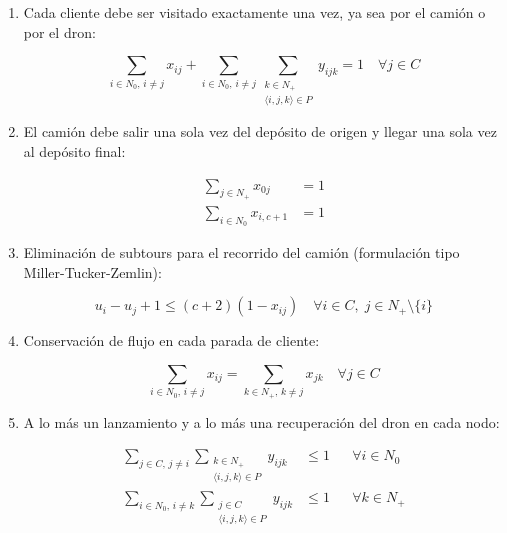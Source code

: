 \begin{enumerate}

\item Cada cliente debe ser visitado exactamente una vez, ya sea por el camión o por el dron:

\begin{equation}
\sum_{i \in N_0,\, i \neq j} x_{ij} + \sum_{i \in N_0,\, i \neq j} \sum_{\substack{k \in N_+ \\ \langle i,j,k \rangle \in P}} y_{ijk} = 1 \quad \forall j \in C 
\tag{2}
\end{equation}

\item El camión debe salir una sola vez del depósito de origen y llegar una sola vez al depósito final:

\begin{align*}
\sum_{j \in N_+} x_{0j} &= 1 \tag{3} \\
\sum_{i \in N_0} x_{i, c+1} &= 1 \tag{4}
\end{align*}

\item Eliminación de subtours para el recorrido del camión (formulación tipo Miller-Tucker-Zemlin):

\begin{equation}
u_i - u_j + 1 \le (c+2)(1 - x_{ij}) \quad \forall i \in C, \; j \in N_+ \setminus \{i\} 
\tag{5}
\end{equation}

\item Conservación de flujo en cada parada de cliente:

\begin{equation}
\sum_{i \in N_0,\, i \neq j} x_{ij} = \sum_{k \in N_+,\, k \neq j} x_{jk} \quad \forall j \in C 
\tag{6}
\end{equation}

\item A lo más un lanzamiento y a lo más una recuperación del dron en cada nodo:

\begin{align*}
\sum_{j \in C,\, j \neq i} \sum_{\substack{k \in N_+ \\ \langle i,j,k \rangle \in P}} y_{ijk} &\le 1 && \forall i \in N_0 \tag{7} \\
\sum_{i \in N_0,\, i \neq k} \sum_{\substack{j \in C \\ \langle i,j,k \rangle \in P}} y_{ijk} &\le 1 && \forall k \in N_+ \tag{8}
\end{align*}


\end{enumerate}
